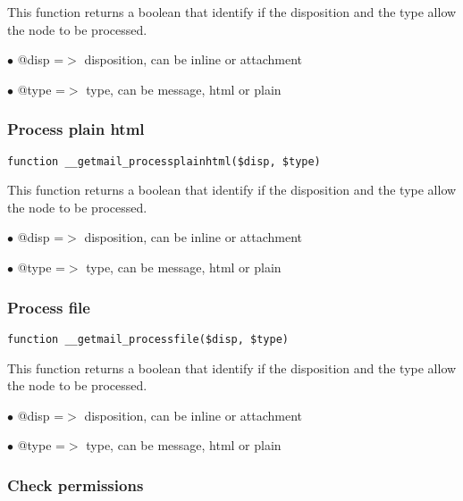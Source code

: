 \documentclass[a4paper]{article}
\begin{document}
This function returns a boolean that identify if the disposition and the type
allow the node to be processed.

\begin{compactitem}
\item[\color{myblue}$\bullet$] @disp =$>$ disposition, can be inline or attachment
\item[\color{myblue}$\bullet$] @type =$>$ type, can be message, html or plain
\end{compactitem}

\hypertarget{toc73}{}
\subsubsection{Process plain html}

\begin{lstlisting}
function __getmail_processplainhtml($disp, $type)
\end{lstlisting}

This function returns a boolean that identify if the disposition and the type
allow the node to be processed.

\begin{compactitem}
\item[\color{myblue}$\bullet$] @disp =$>$ disposition, can be inline or attachment
\item[\color{myblue}$\bullet$] @type =$>$ type, can be message, html or plain
\end{compactitem}

\hypertarget{toc74}{}
\subsubsection{Process file}

\begin{lstlisting}
function __getmail_processfile($disp, $type)
\end{lstlisting}

This function returns a boolean that identify if the disposition and the type
allow the node to be processed.

\begin{compactitem}
\item[\color{myblue}$\bullet$] @disp =$>$ disposition, can be inline or attachment
\item[\color{myblue}$\bullet$] @type =$>$ type, can be message, html or plain
\end{compactitem}

\hypertarget{toc75}{}
\subsubsection{Check permissions}
\end{document}
